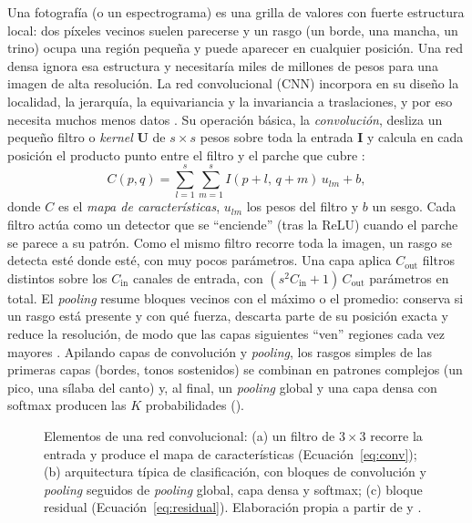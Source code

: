 Una fotografía (o un espectrograma) es una grilla de valores con fuerte
estructura local: dos píxeles vecinos suelen parecerse y un rasgo (un borde,
una mancha, un trino) ocupa una región pequeña y puede aparecer en cualquier
posición. Una red densa ignora esa estructura y necesitaría miles de
millones de pesos para una imagen de alta resolución. La red convolucional
(CNN) incorpora en su diseño la localidad, la jerarquía, la equivariancia y
la invariancia a traslaciones, y por eso necesita muchos menos datos
\citep[pp.~289--290]{bishop2024deep}. Su operación básica, la
\emph{convolución}, desliza un pequeño filtro o \textit{kernel} $\mathbf{U}$
de $s \times s$ pesos sobre toda la entrada $\mathbf{I}$ y calcula en cada
posición el producto punto entre el filtro y el parche que cubre
\citep[p.~292]{bishop2024deep}:
\begin{equation}
  C(p, q) = \sum_{l=1}^{s} \sum_{m=1}^{s} I(p+l,\, q+m)\, u_{lm} + b,
  \label{eq:conv}
\end{equation}
donde $C$ es el \emph{mapa de características}, $u_{lm}$ los pesos del
filtro y $b$ un sesgo. Cada filtro
actúa como un detector que se ``enciende'' (tras la ReLU) cuando el parche se
parece a su patrón. Como el mismo filtro recorre toda la imagen, un rasgo se
detecta esté donde esté, con muy pocos parámetros. Una capa aplica
$C_{\mathrm{out}}$ filtros distintos sobre los $C_{\mathrm{in}}$ canales de
entrada, con $(s^2 C_{\mathrm{in}} + 1)\,C_{\mathrm{out}}$ parámetros en
total. El \emph{pooling} resume bloques
vecinos con el máximo o el promedio: conserva si un rasgo está presente y
con qué fuerza, descarta parte de su posición exacta y reduce la
resolución, de modo que las capas siguientes ``ven'' regiones cada vez
mayores \citep[pp.~296--298]{bishop2024deep}. Apilando capas de convolución
y \textit{pooling}, los rasgos simples de las primeras capas (bordes, tonos
sostenidos) se combinan en patrones complejos (un pico, una sílaba del
canto) y, al final, un \textit{pooling} global y una capa densa con softmax
producen las $K$ probabilidades ().

\begin{figure}[!htb]
  \centering
  \caption{Elementos de una red convolucional: (a) un filtro de $3\times3$
  recorre la entrada y produce el mapa de características
  (Ecuación~\ref{eq:conv}); (b) arquitectura típica de clasificación, con
  bloques de convolución y \textit{pooling} seguidos de \textit{pooling}
  global, capa densa y softmax; (c) bloque residual
  (Ecuación~\ref{eq:residual}). Elaboración propia a partir de
  \citet{bishop2024deep} y \citet{he2016resnet}.}
  \label{fig:cnn}
\end{figure}

